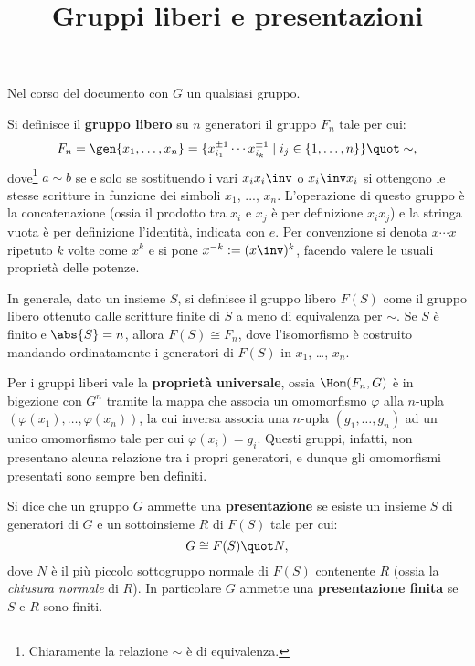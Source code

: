 \documentclass[12pt]{scrartcl}
\begin{document}
	\title{Gruppi liberi e presentazioni}
	\maketitle
	
	\begin{note}
		Nel corso del documento con $G$ un qualsiasi gruppo.
	\end{note}

	Si definisce il \textbf{gruppo libero} su $n$ generatori
	il gruppo $F_n$ tale per cui:
	\[ F_n = \gen{x_1, \ldots, x_n} = \{ x_{i_1}^{\pm 1} \cdots x_{i_k}^{\pm 1} \mid i_j \in \{1, \ldots, n\} \} \quot \sim, \]
	dove\footnote{
		Chiaramente la relazione $\sim$ è di equivalenza.
	} $a \sim b$ se e solo se sostituendo i vari $x_i x_i\inv$ 
	o $x_i\inv x_i$ si ottengono le stesse scritture in
	funzione dei simboli $x_1$, ..., $x_n$. L'operazione di
	questo gruppo è la concatenazione (ossia il prodotto tra
	$x_i$ e $x_j$ è per definizione $x_i x_j$) e la stringa
	vuota è per definizione l'identità, indicata con $e$.
	Per convenzione si denota $x \cdots x$ ripetuto $k$ volte come $x^k$ e si pone $x^{-k} := (x\inv)^k$, facendo
	valere le usuali proprietà delle potenze. \medskip
	
	
	In generale, dato un insieme $S$, si definisce
	il gruppo libero $F(S)$ come il gruppo libero ottenuto
	dalle scritture finite di $S$ a meno di equivalenza per
	$\sim$. Se $S$ è finito e $\abs{S} = n$, allora
	$F(S) \cong F_n$, dove l'isomorfismo è costruito mandando
	ordinatamente i generatori di $F(S)$ in
	$x_1$, \ldots, $x_n$. \medskip


	Per i gruppi liberi vale la \textbf{proprietà universale},
	ossia $\Hom(F_n, G)$ è in bigezione con $G^n$ tramite
	la mappa che associa un omomorfismo $\varphi$ alla $n$-upla
	$(\varphi(x_1), \ldots, \varphi(x_n))$, la cui inversa associa
	una $n$-upla $(g_1, \ldots, g_n)$ ad un unico omomorfismo
	tale per cui $\varphi(x_i) = g_i$. Questi gruppi, infatti,
	non presentano alcuna relazione tra i propri generatori,
	e dunque gli omomorfismi presentati sono sempre ben definiti. \medskip
	
	
	Si dice che un gruppo $G$ ammette una \textbf{presentazione} se esiste un insieme $S$ di generatori di $G$ e un sottoinsieme $R$ di $F(S)$ tale per cui:
	\[ G \cong F(S) \quot N, \]
	dove $N$ è il più piccolo sottogruppo normale di
	$F(S)$ contenente $R$ (ossia la \textit{chiusura normale}
	di $R$). In particolare $G$ ammette una \textbf{presentazione finita} se $S$ e $R$ sono finiti. \medskip
	
\end{document}
